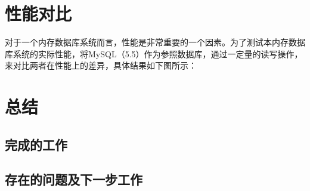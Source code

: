 \documentclass{zjutthesis}
\begin{document}
\begin{table}[H]
\centering
\caption{系统目录规划表（GUI部分）}\label{tab:GUI-files}
\vspace{\baselineskip}
\end{table}


\chapter{性能对比}
对于一个内存数据库系统而言，性能是非常重要的一个因素。为了测试本内存数据库系统的实际性能，将MySQL（5.5）作为参照数据库，通过一定量的读写操作，来对比两者在性能上的差异，具体结果如下图所示：

\chapter{总结}
\section{完成的工作}

\section{存在的问题及下一步工作}

\backmatter


\nocite{*}                                   %


\appendix

\end{document}
